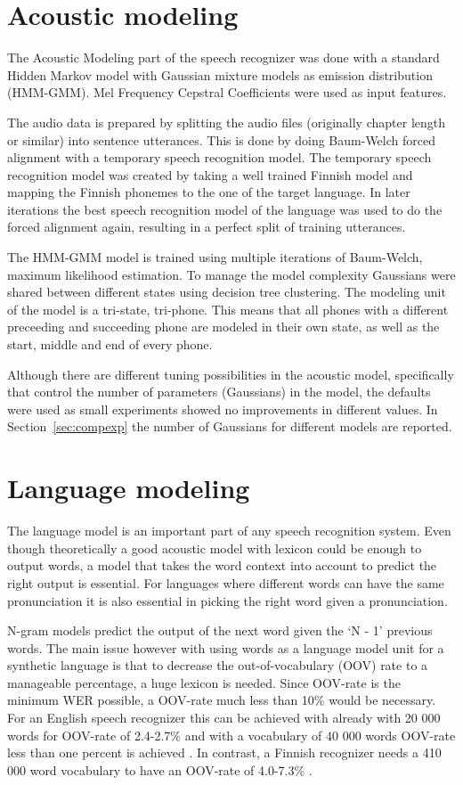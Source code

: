 \documentclass[b5paper]{article}
\begin{document}
\section{Acoustic modeling}
\label{sec:align}
The Acoustic Modeling part of the speech recognizer was done with a standard Hidden Markov model with Gaussian mixture models as emission distribution (HMM-GMM). Mel Frequency Cepstral Coefficients were used as input features. 

The audio data is prepared by splitting the audio files (originally chapter length or similar) into sentence utterances. This is done by doing Baum-Welch forced alignment with a temporary speech recognition model. The temporary speech recognition model was created by taking a well trained Finnish model and mapping the Finnish phonemes to the one of the target language. In later iterations the best speech recognition model of the language was used to do the forced alignment again, resulting in a perfect split of training utterances.

The HMM-GMM model is trained using multiple iterations of Baum-Welch, maximum likelihood estimation. To manage the model complexity Gaussians were shared between different states using decision tree clustering. The modeling unit of the model is a tri-state, tri-phone. This means that all phones with a different preceeding and succeeding phone are modeled in their own state, as well as the start, middle and end of every phone.

Although there are different tuning possibilities in the acoustic model, specifically that control the number of parameters (Gaussians) in the model, the defaults were used as small experiments showed no improvements in different values. In Section~\ref{sec:compexp} the number of Gaussians for different models are reported.


\section{Language modeling}

The language model is an important part of any speech recognition system. Even though theoretically a good acoustic model with lexicon could be enough to output words, a model that takes the word context into account to predict the right output is essential. For languages where different words can have the same pronunciation it is also essential in picking the right word given a pronunciation. 

N-gram models predict the output of the next word given the `N - 1' previous words. The main issue however with using words as a language model unit for a synthetic language is that to decrease the out-of-vocabulary (OOV) rate to a manageable percentage, a huge lexicon is needed. Since OOV-rate is the minimum WER possible, a OOV-rate much less than 10\% would be necessary. For an English speech recognizer this can be achieved with already with 20 000 words for OOV-rate of 2.4-2.7\% and with a vocabulary of 40 000 words OOV-rate less than one percent is achieved \cite{woodland19951994}. In contrast, a Finnish recognizer needs a 410 000 word vocabulary to have an OOV-rate of 4.0-7.3\% \cite{hirsimaki2006unlimited}.
\end{document}
